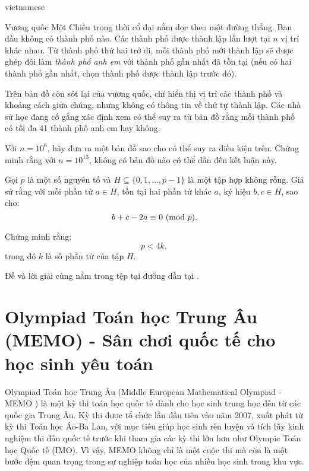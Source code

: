 \documentclass{article}
\begin{document}
\begin{otherlanguage*}{vietnamese}
\begin{problem*}
    Vương quốc Một Chiều trong thời cổ đại nằm dọc theo một đường thẳng. Ban đầu không có thành phố nào. Các thành phố được thành lập lần lượt tại \( n \) vị trí khác nhau.  
    Từ thành phố thứ hai trở đi, mỗi thành phố mới thành lập sẽ được ghép đôi làm \textit{thành phố anh em} với thành phố gần nhất đã tồn tại (nếu có hai thành phố gần nhất,
    chọn thành phố được thành lập trước đó).  

    Trên bản đồ còn sót lại của vương quốc, chỉ hiển thị vị trí các thành phố và khoảng cách giữa chúng, nhưng không có thông tin về thứ tự thành lập.
    Các nhà sử học đang cố gắng xác định xem có thể suy ra từ bản đồ rằng mỗi thành phố có tối đa 41 thành phố anh em hay không.  

    \begin{enumerate}[topsep=0pt, partopsep=0pt, itemsep=0pt]
        \ii Với \( n = 10^6 \), hãy đưa ra một bản đồ sao cho có thể suy ra điều kiện trên.  
        \ii Chứng minh rằng với \( n = 10^{13} \), không có bản đồ nào có thể dẫn đến kết luận này.  
    \end{enumerate}
\end{problem*}

\begin{problem*}
    Gọi \( p \) là một số nguyên tố và \( H \subseteq \{0, 1, \dots, p-1\} \) là một tập hợp không rỗng.
    Giả sử rằng với mỗi phần tử \( a \in H \), tồn tại hai phần tử khác \( a \), ký hiệu \( b, c \in H \), sao cho:
    \[
        b + c - 2a \equiv 0 \ (\mathrm{mod}\ p).
    \]
    
    Chứng minh rằng:
    \[
        p < 4k,
    \]
    trong đó \( k \) là số phần tử của tập \( H \).
\end{problem*}

\begin{remark*}
    Đề và lời giải cùng nằm trong tệp tại đường dẫn tại \cite{k_2024}.
\end{remark*}

\newpage

\section{Olympiad Toán học Trung Âu (MEMO) - Sân chơi quốc tế cho học sinh yêu toán}

Olympiad Toán học Trung Âu (Middle European Mathematical Olympiad - MEMO \cite{MEMO}) là một kỳ thi toán học quốc tế dành cho học sinh trung học đến từ các quốc gia Trung Âu.
Kỳ thi được tổ chức lần đầu tiên vào năm 2007, xuất phát từ kỳ thi Toán học Áo-Ba Lan,
với mục tiêu giúp học sinh rèn luyện và tích lũy kinh nghiệm thi đấu quốc tế trước khi tham gia các kỳ thi lớn hơn như Olympic Toán học Quốc tế (IMO).
Vì vậy, MEMO không chỉ là một cuộc thi mà còn là một bước đệm quan trọng trong sự nghiệp toán học của nhiều học sinh trong khu vực.


\end{otherlanguage*}
\end{document}
